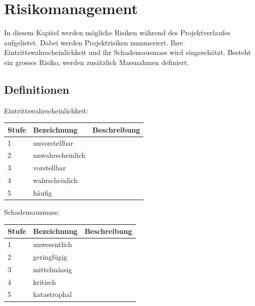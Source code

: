 \documentclass[a4paper]{report}
\begin{document}
\chapter{Risikomanagement}
In diesem Kapitel werden mögliche Risiken während des Projektverlaufes aufgelistet. Dabei werden Projektrisiken nummeriert. Ihre Eintrittswahrscheinlichkeit und ihr Schadensausmass wird eingeschätzt. Besteht ein grosses Risiko, werden zusätzlich Massnahmen definiert.

\section{Definitionen}

\vspace{1em}
\noindent
Eintrittswahrscheinlichkeit:

\vspace{1em}
\noindent
\begin{tabular}{|p{}|p{}|p{}|}
	\hline
	\textbf{Stufe} & \textbf{Bezeichnung} & \textbf{Beschreibung} \\
	\hline
	1 & unvorstellbar & \\
	\hline
	2 & unwahrscheinlich & \\
	\hline
	3 & vorstellbar & \\
	\hline
	4 & wahrscheinlich & \\
	\hline
	5 & häufig & \\
	\hline
\end{tabular}

\vspace{1em}
\noindent
Schadensausmass:

\vspace{1em}
\noindent
\begin{tabular}{|p{}|p{}|p{}|}
	\hline
	\textbf{Stufe} & \textbf{Bezeichnung} & \textbf{Beschreibung} \\
	\hline
	1 & unwesentlich & \\
	\hline
	2 & geringfügig & \\
	\hline
	3 & mittelmässig & \\
	\hline
	4 & kritisch & \\
	\hline
	5 & katastrophal & \\
	\hline
\end{tabular}
\end{document}
